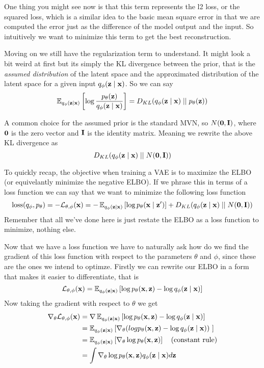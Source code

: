 \documentclass[12pt]{article}
\begin{document}
One thing you might see now is that this term represents the l2 loss, or the squared loss, which is a similar idea to the basic mean square error in that we are computed the error just as the difference of the model output and the input. So intuitively we want to minimize this term to get the best reconstruction.
\smallskip

Moving on we still have the regularization term to understand. It might look a bit weird at first but its simply the KL divergence between the prior, that is the \textit{assumed distribution} of the latent space and the approximated distribution of the latent space for a given input $q_\phi(\mathbf{z}\mid \mathbf{x})$. So we can say 
\[
    \operatorname{\mathbb{E}}_{q_\phi(\mathbf{z}\mid \mathbf{x})} \left[\log \frac{p_\theta(\mathbf{z})}{q_\phi(\mathbf{z}\mid \mathbf{x})}\right] = D_{KL}(q_\phi(\mathbf{z}\mid \mathbf{x}) \mid\mid p_\theta(\mathbf{z}))    
\]

A common choice for the assumed prior is the standard MVN, so $N(\mathbf{0}, \mathbf{I})$, where $\mathbf{0}$ is the zero vector and $\mathbf{I}$ is the identity matrix. Meaning we rewrite the above KL divergence as 
\[
    D_{KL}(q_\phi(\mathbf{z}\mid \mathbf{x}) \mid\mid N(\mathbf{0}, \mathbf{I}))    
\]

To quickly recap, the objective when training a VAE is to maximize the ELBO (or equivelantly minimize the negative ELBO). If we phrase this in terms of a loss function we can say that we want to minimize the following loss function 
\[
    \text{loss}(q_\phi, p_\theta) = -\mathcal L_{\theta, \phi}(\mathbf{x}) = -\operatorname{\mathbb{E}}_{q_\phi(\mathbf{z}\mid \mathbf{x})} \left[\log p_\theta(\mathbf{x} \mid \mathbf{z}') \right] + D_{KL}(q_\phi(\mathbf{z}\mid \mathbf{x}) \mid\mid N(\mathbf{0}, \mathbf{I}))    
\]
Remember that all we've done here is just restate the ELBO as a loss function to minimize, nothing else.
\smallskip 

Now that we have a loss function we have to naturally ask how do we find the gradient of this loss function with respect to the parameters $\theta$ and $\phi$, since these are the ones we intend to optimze. Firstly we can rewrite our ELBO in a form that makes it easier to differentiate, that is
\[
    \mathcal L_{\theta, \phi}(\mathbf{x}) = \operatorname{\mathbb{E}}_{q_\phi(\mathbf{z}\mid \mathbf{x})} \left[ \log p_\theta(\mathbf{x}, \mathbf{z}) - \log q_\phi(\mathbf{z} \mid \mathbf{x})\right]  
\]
Now taking the gradient with respect to $\theta$ we get
\begin{align*}
    \nabla_\theta \mathcal L _{\theta, \phi}(\mathbf{x}) &= \nabla \operatorname{\mathbb{E}}_{q_\phi(\mathbf{z}\mid \mathbf{x})} \left[ \log p_\theta(\mathbf{x}, \mathbf{z}) - \log q_\phi(\mathbf{z} \mid \mathbf{x})\right] \\
    &= \operatorname{\mathbb{E}}_{q_\phi(\mathbf{z}\mid \mathbf{x})} \left[ \nabla_\theta (log p_\theta(\mathbf{x}, \mathbf{z}) - \log q_\phi(\mathbf{z} \mid \mathbf{x}))\ \right] \\
    &= \operatorname{\mathbb{E}}_{q_\phi(\mathbf{z}\mid \mathbf{x})} \left[ \nabla_\theta \log p_\theta(\mathbf{x}, \mathbf{z})\right]\quad (\text{constant rule}) \\ 
    &= \int \nabla_\theta \log p_\theta(\mathbf{x}, \mathbf{z})q_\phi(\mathbf{z}\mid \mathbf{x}) d\mathbf{z}
\end{align*}
\end{document}

